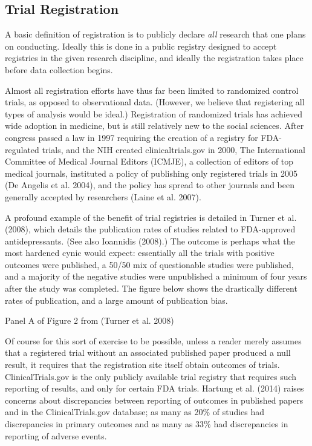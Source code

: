 \documentclass[12pt] {article}
\begin{document}
\subsection{Trial Registration}\label{trial-registration}

A basic definition of registration is to publicly declare \emph{all}
research that one plans on conducting. Ideally this is done in a public
registry designed to accept registries in the given research discipline,
and ideally the registration takes place before data collection begins.

Almost all registration efforts have thus far been limited to randomized
control trials, as opposed to observational data. (However, we believe
that registering all types of analysis would be ideal.) Registration of
randomized trials has achieved wide adoption in medicine, but is still
relatively new to the social sciences. After congress passed a law in
1997 requiring the creation of a registry for FDA-regulated trials, and
the NIH created clinicaltrials.gov in 2000, The International Committee
of Medical Journal Editors (ICMJE), a collection of editors of top
medical journals, instituted a policy of publishing only registered
trials in 2005 (De Angelis et al. 2004), and the policy has spread to
other journals and been generally accepted by researchers (Laine et al.
2007).

A profound example of the benefit of trial registries is detailed in
Turner et al. (2008), which details the publication rates of studies
related to FDA-approved antidepressants. (See also Ioannidis (2008).)
The outcome is perhaps what the most hardened cynic would expect:
essentially all the trials with positive outcomes were published, a
50/50 mix of questionable studies were published, and a majority of the
negative studies were unpublished a minimum of four years after the
study was completed. The figure below shows the drastically different
rates of publication, and a large amount of publication bias.


Panel A of Figure 2 from (Turner et al. 2008)

Of course for this sort of exercise to be possible, unless a reader
merely assumes that a registered trial without an associated published
paper produced a null result, it requires that the registration site
itself obtain outcomes of trials. ClinicalTrials.gov is the only
publicly available trial registry that requires such reporting of
results, and only for certain FDA trials. Hartung et al. (2014) raises
concerns about discrepancies between reporting of outcomes in published
papers and in the ClinicalTrials.gov database; as many as 20\% of
studies had discrepancies in primary outcomes and as many as 33\% had
discrepancies in reporting of adverse events.
\end{document}
